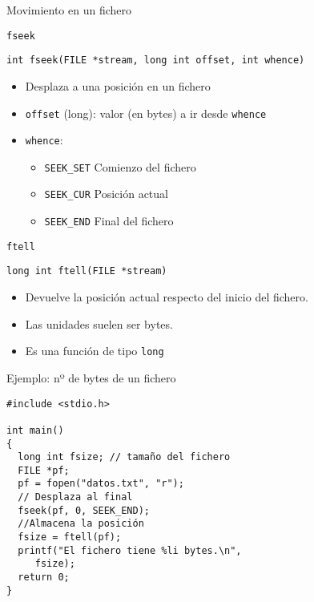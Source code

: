 \documentclass[xcolor={usenames,svgnames,dvipsnames}, aspectratio=169]{beamer}
\begin{document}
\begin{frame}[label={sec:org9dd02de},fragile,plain]{Movimiento en un fichero}
 \begin{block}{\texttt{fseek}}
\lstset{language=C,label= ,caption= ,captionpos=b,numbers=none}
\begin{lstlisting}
int fseek(FILE *stream, long int offset, int whence)
\end{lstlisting}

\begin{itemize}
\item Desplaza a una posición en un fichero
\item \texttt{offset} (long): valor (en bytes) a ir desde \texttt{whence}
\item \texttt{whence}:
\begin{itemize}
\item \texttt{SEEK\_SET} Comienzo del fichero
\item \texttt{SEEK\_CUR} Posición actual
\item \texttt{SEEK\_END} Final del fichero
\end{itemize}
\end{itemize}
\end{block}

\begin{block}{\texttt{ftell}}
\lstset{language=C,label= ,caption= ,captionpos=b,numbers=none}
\begin{lstlisting}
long int ftell(FILE *stream)
\end{lstlisting}

\begin{itemize}
\item Devuelve la posición actual respecto del inicio del fichero.
\item Las unidades suelen ser \alert{bytes}.
\item Es una función de tipo \texttt{long}
\end{itemize}
\end{block}
\end{frame}

\begin{frame}[label={sec:org49cd459},fragile]{Ejemplo: nº de bytes de un fichero}
 \lstset{language=C,label= ,caption= ,captionpos=b,numbers=none}
\begin{lstlisting}
#include <stdio.h>

int main()
{
  long int fsize; // tamaño del fichero
  FILE *pf;
  pf = fopen("datos.txt", "r");
  // Desplaza al final
  fseek(pf, 0, SEEK_END);
  //Almacena la posición
  fsize = ftell(pf);
  printf("El fichero tiene %li bytes.\n",
	 fsize);
  return 0;
}
\end{lstlisting}
\end{frame}
\end{document}
